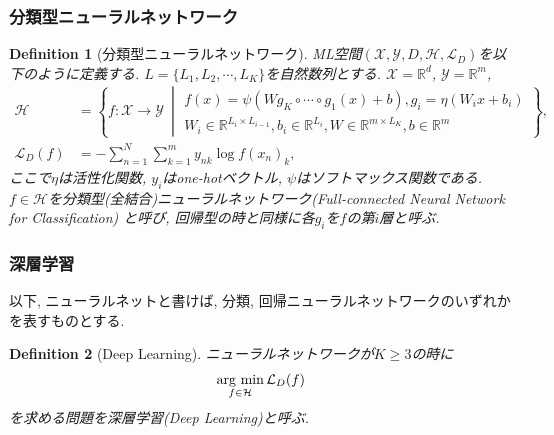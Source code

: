 \documentclass[dvipdfmx,11pt]{beamer}		%
\newtheorem{defi}{Definition}
\newcommand{\R}{\mathbb{R}}
\newcommand{\X}{\mathcal{X}}
\newcommand{\Y}{\mathcal{Y}}
\newcommand{\Hil}{\mathcal{H}}
\newcommand{\Loss}{\mathcal{L}_{D}}
\newcommand{\MLsp}{(\X, \Y, D, \Hil, \Loss)}
\newcommand{\argmin}{\mathop{\rm arg~min}\limits}
\begin{document}
    \begin{frame}
        \frametitle{分類型ニューラルネットワーク}
        \begin{defi}[分類型ニューラルネットワーク]
            ML空間$\MLsp$を以下のように定義する. $L = \{L_{1}, L_{2}, \cdots, L_{K}\}$を自然数列とする.
            $\X = \R^d$, $\Y = \R^{m}$, 
            \footnotesize
            \begin{align*}
                \Hil &= \left\{f:\X\to\Y~\middle|
                \begin{array}{l}
                    f(x) = \psi(W g_{K}\circ\cdots\circ g_{1}(x) + b), g_{i} = \eta(W_{i}x + b_{i})\\
                        W_{i}\in\R^{L_{i}\times L_{i - 1}}, b_{i}\in\R^{L_{i}}, W\in\R^{m\times L_{K}}, b\in\R^{m}
                \end{array}
                \right\},\\
                \Loss(f) &= -\sum_{n = 1}^{N}\sum_{k = 1}^{m}y_{nk}\log f(x_n)_{k},
            \end{align*}
            \normalsize
            ここで$\eta$は活性化関数, $y_{i}$はone-hotベクトル, $\psi$はソフトマックス関数である. $f\in\Hil$を分類型(全結合)ニューラルネットワーク(Full-connected Neural Network for Classification)
            と呼び, 回帰型の時と同様に各$g_{i}$を$f$の第$i$層と呼ぶ.
        \end{defi}
    \end{frame}
    \begin{frame}
        \frametitle{深層学習}
        以下, ニューラルネットと書けば, 分類, 回帰ニューラルネットワークのいずれかを表すものとする. 
        \begin{defi}[Deep Learning]
            ニューラルネットワークが$K \geq 3$の時に
            \begin{align*}
                \argmin_{f\in\Hil}\Loss(f)
            \end{align*}
            を求める問題を深層学習(Deep Learning)と呼ぶ.
        \end{defi}
    \end{frame}
\end{document}

